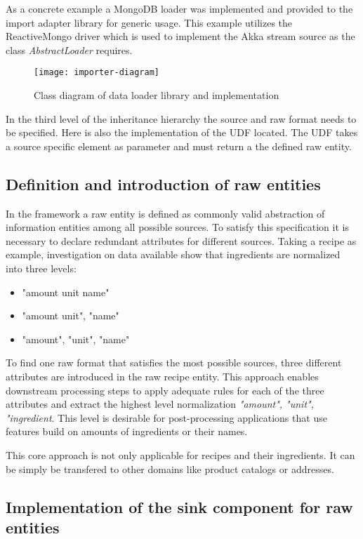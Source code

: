 As a concrete example a MongoDB loader was implemented and provided to the import adapter library for generic usage. This example utilizes the ReactiveMongo driver which is used to implement the Akka stream source as the class \textit{AbstractLoader} requires.

\begin{figure}[htb]
  \centering
  \texttt{[image: importer-diagram]}\\
  \caption{Class diagram of data loader library and implementation}
  \label{fig:importer-diagram}
\end{figure}

In the third level of the inheritance hierarchy the source and raw format needs to be specified. Here is also the implementation of the UDF located. The UDF takes a source specific element as parameter and must return a the defined raw entity.

\subsection{Definition and introduction of raw entities}
In the framework a raw entity is defined as commonly valid abstraction of information entities among all possible sources. To satisfy this specification it is necessary to declare redundant attributes for different sources. Taking a recipe as example, investigation on data available show that ingredients are normalized into three levels:
\begin{itemize}
\item "amount unit name"
\item "amount unit", "name"
\item "amount", "unit", "name"
\end{itemize}
To find one raw format that satisfies the most possible sources, three different attributes are introduced in the raw recipe entity. This approach enables downstream processing steps to apply adequate rules for each of the three attributes and extract the highest level normalization \textit{"amount", "unit", "ingredient}. This level is desirable for post-processing applications that use features build on amounts of ingredients or their names.

This core approach is not only applicable for recipes and their ingredients. It can be simply be transfered to other domains like product catalogs or addresses.  

\subsection{Implementation of the sink component for raw entities}

